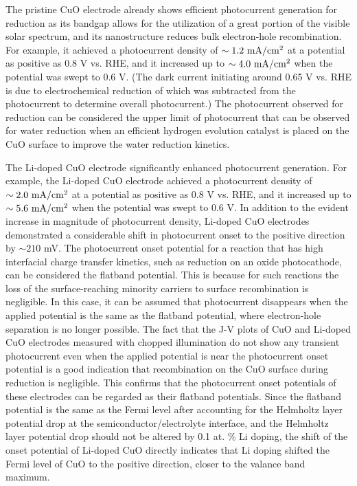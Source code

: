 The pristine CuO electrode already shows efficient photocurrent generation for  reduction as its bandgap allows for the utilization of a great portion of the visible solar spectrum, and its nanostructure reduces bulk electron-hole recombination.  For example, it achieved a photocurrent density of $\sim 1.2\ {\rm mA/cm^2}$ at a potential as positive as 0.8 V vs. RHE, and it increased up to $\sim 4.0\ {\rm mA/cm^2}$ when the potential was swept to 0.6 V. (The dark current initiating around 0.65 V vs. RHE is due to electrochemical reduction of  which was subtracted from the photocurrent to determine overall photocurrent.) The photocurrent observed for  reduction can be considered the upper limit of photocurrent that can be observed for water reduction when an efficient hydrogen evolution catalyst is placed on the CuO surface to improve the water reduction kinetics.

The Li-doped CuO electrode significantly enhanced photocurrent generation. For example, the Li-doped CuO electrode achieved a photocurrent density of $\sim 2.0\ {\rm mA/cm^2}$ at a potential as positive as 0.8 V vs. RHE, and it increased up to $\sim 5.6\ {\rm mA/cm^2}$ when the potential was swept to 0.6 V. In addition to the evident increase in magnitude of photocurrent density, Li-doped CuO electrodes demonstrated a considerable shift in photocurrent onset to the positive direction by $\sim 210$ mV. The photocurrent onset potential for a reaction that has high interfacial charge transfer kinetics, such as  reduction on an oxide photocathode, can be considered the flatband potential. This is because for such reactions the loss of the surface-reaching minority carriers to surface recombination is negligible.  In this case, it can be assumed that photocurrent disappears when the applied potential is the same as the flatband potential, where electron-hole separation is no longer possible.  The fact that the J-V plots of CuO and Li-doped CuO electrodes measured with chopped illumination do not show any transient photocurrent even when the applied potential is near the photocurrent onset potential is a good indication that recombination on the CuO surface during  reduction is negligible. This confirms that the photocurrent onset potentials of these electrodes can be regarded as their flatband potentials. Since the flatband potential is the same as the Fermi level after accounting for the Helmholtz layer potential drop at the semiconductor/electrolyte interface, and the Helmholtz layer potential drop should not be altered by 0.1 at. \% Li doping, the shift of the onset potential of Li-doped CuO directly indicates that Li doping shifted the Fermi level of CuO to the positive direction, closer to the valance band maximum.~\cite{nozik1978photoelectrochemistry}


